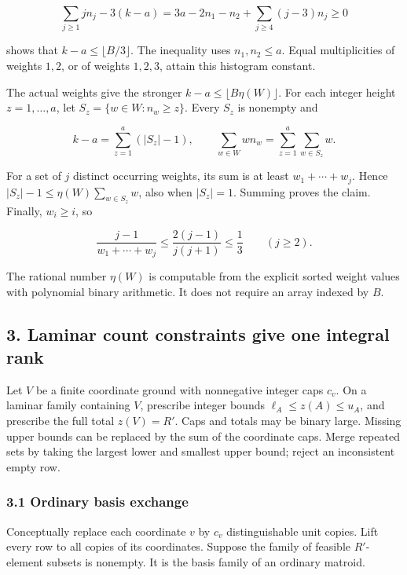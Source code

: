 \[
\sum_{j\ge1}j n_j-3(k-a)
=3a-2n_1-n_2+\sum_{j\ge4}(j-3)n_j\ge0
\tag{DW4}
\]

shows that \(k-a\le\lfloor B/3\rfloor\). The inequality uses \(n_1,n_2\le a\). Equal multiplicities of weights \(1,2\), or of weights \(1,2,3\), attain this histogram constant.

The actual weights give the stronger \(k-a\le\lfloor B\eta(W)\rfloor\). For each integer height \(z=1,\ldots,a\), let \(S_z=\{w\in W:n_w\ge z\}\). Every \(S_z\) is nonempty and

\[
k-a=\sum_{z=1}^{a}(|S_z|-1),
\qquad
\sum_{w\in W}w n_w
=\sum_{z=1}^{a}\sum_{w\in S_z}w.
\tag{DW5}
\]

For a set of \(j\) distinct occurring weights, its sum is at least \(w_1+\cdots+w_j\). Hence \(|S_z|-1\le\eta(W)\sum_{w\in S_z}w\), also when \(|S_z|=1\). Summing proves the claim. Finally, \(w_i\ge i\), so

\[
\frac{j-1}{w_1+\cdots+w_j}
\le \frac{2(j-1)}{j(j+1)}\le\frac13
\qquad(j\ge2).
\tag{DW6}
\]

The rational number \(\eta(W)\) is computable from the explicit sorted weight values with polynomial binary arithmetic. It does not require an array indexed by \(B\).

\hypertarget{af-fe230a140d-laminar-count-constraints-give-one-integral-rank}{%
\subsection{3. Laminar count constraints give one integral rank}\label{af-fe230a140d-laminar-count-constraints-give-one-integral-rank}}

Let \(V\) be a finite coordinate ground with nonnegative integer caps \(c_v\). On a laminar family containing \(V\), prescribe integer bounds \(\ell_A\le z(A)\le u_A\), and prescribe the full total \(z(V)=R'\). Caps and totals may be binary large. Missing upper bounds can be replaced by the sum of the coordinate caps. Merge repeated sets by taking the largest lower and smallest upper bound; reject an inconsistent empty row.

\hypertarget{af-fe230a140d-ordinary-basis-exchange}{%
\subsubsection{3.1 Ordinary basis exchange}\label{af-fe230a140d-ordinary-basis-exchange}}

Conceptually replace each coordinate \(v\) by \(c_v\) distinguishable unit copies. Lift every row to all copies of its coordinates. Suppose the family of feasible \(R'\)-element subsets is nonempty. It is the basis family of an ordinary matroid.

